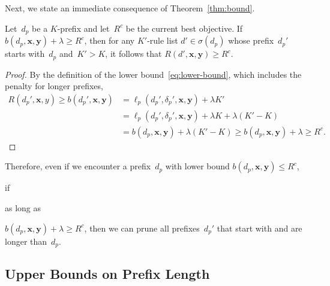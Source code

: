 \documentclass[twoside,11pt]{article}
\newcommand{\x}{\mathbf{x}}
\newcommand{\y}{\mathbf{y}}
\def\RL{{d}}
\def\Prefix{d_p}
\def\Labels{\delta_p}
\def\Obj{R}
\def\Loss{\ell}
\def\Reg{{\lambda}}
\def\CurrentObj{{R^c}}
\def\StartsWith{\sigma}
\newcommand{\nn}{\nonumber}
\begin{document}
Next, we state an immediate consequence of Theorem~\ref{thm:bound}.

\begin{lemma}
\label{lemma:lookahead}
Let~$\Prefix$ be a $K$-prefix
and let~$\CurrentObj$ be the current best objective.
%
If ${b(\Prefix, \x, \y) + \Reg \ge \CurrentObj}$,
then for any $K'$-rule list ${\RL' \in \StartsWith(\Prefix)}$
whose prefix~$\Prefix'$ starts with~$\Prefix$ and~${K' > K}$,
it follows that ${\Obj(\RL', \x, \y) \ge \CurrentObj}$.
\end{lemma}

\begin{arxiv}
\begin{proof}
By the definition of the lower bound~\eqref{eq:lower-bound},
which includes the penalty for longer prefixes,
\begin{align}
\Obj(\Prefix', \x, y) \ge b(\Prefix', \x, \y) &= \Loss_p(\Prefix', \Labels', \x, \y) + \Reg K' \nn \\
&= \Loss_p(\Prefix', \Labels', \x, \y) + \Reg K + \Reg (K' - K) \nn \\
&= b(\Prefix, \x, \y) + \Reg (K' - K)
\ge b(\Prefix, \x, \y) + \Reg \ge \CurrentObj.
\end{align}
\end{proof}
\end{arxiv}

Therefore, even if we encounter a prefix~$\Prefix$
with lower bound ${b(\Prefix, \x, \y) \le \CurrentObj}$,
\begin{kdd}
if
\end{kdd}
\begin{arxiv}
as long as
\end{arxiv}
${b(\Prefix, \x, \y) + \Reg \ge \CurrentObj}$, then we can prune
all prefixes~$\Prefix'$ that start with and are longer than~$\Prefix$.

\subsection{Upper Bounds on Prefix Length}
\label{sec:ub-prefix-length}
\end{document}

